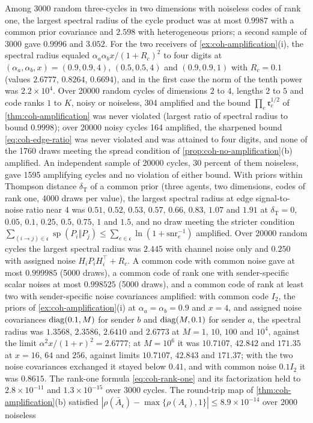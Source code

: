 \begin{numcheck}\label{chk:coh-amplification}
Among 3000 random three-cycles in two dimensions with noiseless codes of rank one, the largest spectral radius of the cycle product was at most $0.9987$ with a common prior covariance and $2.598$ with heterogeneous priors; a second sample of 3000 gave $0.9996$ and $3.052$. For the two receivers of \cref{ex:coh-amplification}(i), the spectral radius equaled $\alpha_a\alpha_bx/(1+R_c)^2$ to four digits at $(\alpha_a,\alpha_b,x)=(0.9,0.9,4)$, $(0.5,0.5,4)$ and $(0.9,0.9,1)$ with $R_c=0.1$ (values $2.6777$, $0.8264$, $0.6694$), and in the first case the norm of the tenth power was $2.2\times10^4$. Over 20000 random cycles of dimensions $2$ to $4$, lengths $2$ to $5$ and code ranks $1$ to $K$, noisy or noiseless, 304 amplified and the bound $\prod_e\mathfrak r_e^{1/2}$ of \cref{thm:coh-amplification} was never violated (largest ratio of spectral radius to bound $0.9998$); over 20000 noisy cycles 164 amplified, the sharpened bound \eqref{eq:coh-edge-ratio} was never violated and was attained to four digits, and none of the 1760 draws meeting the spread condition of \cref{prop:coh-no-amplification}(b) amplified. An independent sample of 20000 cycles, 30 percent of them noiseless, gave 1595 amplifying cycles and no violation of either bound. With priors within Thompson distance $\delta_{\mathrm T}$ of a common prior (three agents, two dimensions, codes of rank one, 4000 draws per value), the largest spectral radius at edge signal-to-noise ratio near $4$ was $0.51$, $0.52$, $0.53$, $0.57$, $0.66$, $0.83$, $1.07$ and $1.91$ at $\delta_{\mathrm T}=0$, $0.05$, $0.1$, $0.25$, $0.5$, $0.75$, $1$ and $1.5$, and no draw meeting the stricter condition $\sum_{(i\to j)\in\mathfrak c}\operatorname{sp}(P_i\Vert P_j)\le\sum_{e\in\mathfrak c}\ln(1+\mathrm{snr}_e^{-1})$ amplified. Over 20000 random cycles the largest spectral radius was $2.445$ with channel noise only and $0.250$ with assigned noise $H_iP_iH_i^\top+R_c$. A common code with common noise gave at most $0.999985$ (5000 draws), a common code of rank one with sender-specific scalar noises at most $0.998525$ (5000 draws), and a common code of rank at least two with sender-specific noise covariances amplified: with common code $I_2$, the priors of \cref{ex:coh-amplification}(i) at $\alpha_a=\alpha_b=0.9$ and $x=4$, and assigned noise covariances $\operatorname{diag}(0.1,M)$ for sender $b$ and $\operatorname{diag}(M,0.1)$ for sender $a$, the spectral radius was $1.3568$, $2.3586$, $2.6410$ and $2.6773$ at $M=1$, $10$, $100$ and $10^4$, against the limit $\alpha^2x/(1+r)^2=2.6777$; at $M=10^6$ it was $10.7107$, $42.842$ and $171.35$ at $x=16$, $64$ and $256$, against limits $10.7107$, $42.843$ and $171.37$; with the two noise covariances exchanged it stayed below $0.41$, and with common noise $0.1I_2$ it was $0.8615$. The rank-one formula \eqref{eq:coh-rank-one} and its factorization held to $2.8\times10^{-11}$ and $1.3\times10^{-15}$ over 3000 cycles. The round-trip map of \cref{thm:coh-amplification}(b) satisfied $|\rho(\bar A_{\mathfrak c})-\max\{\rho(A_{\mathfrak c}),1\}|\le8.9\times10^{-14}$ over 2000 noiseless 
\end{numcheck}
